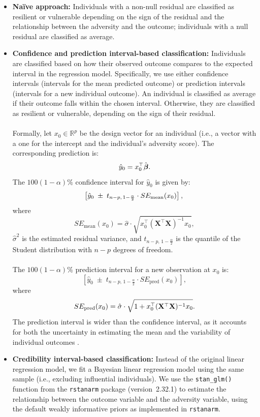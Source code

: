 \documentclass[12pt]{article}
\begin{document}
\begin{itemize}
\item \textbf{Naïve approach:} Individuals with a non-null residual are classified as resilient or vulnerable depending on the sign of the residual and the relationship between the adversity and the outcome; individuals with a null residual are classified as average.

\item \textbf{Confidence and prediction interval-based classification:}  
Individuals are classified based on how their observed outcome compares to the expected interval in the regression model. Specifically, we use either confidence intervals (intervals for the mean predicted outcome) or prediction intervals (intervals for a new individual outcome). An individual is classified as average if their outcome falls within the chosen interval. Otherwise, they are classified as resilient or vulnerable, depending on the sign of their residual.\\
\\
Formally, let \( x_0 \in \mathbb{R}^p \) be the design vector for an individual (i.e., a vector with a one for the intercept and the individual's adversity score). The corresponding prediction is:
\[
\hat y_0 = x_0^\top \hat{\boldsymbol{\beta}}.\\
\]
The \( 100(1 - \alpha)\% \) confidence interval for \(\hat y_0\) is given by:
\[
\left[ \hat y_0 \; \pm \; t_{n-p,\,1 - \frac{\alpha}{2}} \cdot SE_{\text{mean}}(x_0) \right],\\
\]
where
\[
SE_{\text{mean}}(x_0) = \hat{\sigma} \cdot \sqrt{x_0^\top (\mathbf{X}^\top \mathbf{X})^{-1} x_0},
\]
\( \hat{\sigma}^2 \) is the estimated residual variance, and \( t_{n-p,\,1 - \frac{\alpha}{2}} \) is the quantile of the Student distribution with \( n - p \) degrees of freedom.\\
\\
The \( 100(1 - \alpha)\% \) prediction interval for a new observation at \( x_0 \) is:
\[
\left[ \hat y_0 \; \pm \; t_{n-p,\,1 - \frac{\alpha}{2}} \cdot SE_{\text{pred}}(x_0) \right],
\]
where
\[
SE_{\text{pred}}(x_0) = \hat{\sigma} \cdot \sqrt{1 + x_0^\top (\mathbf{X}^\top \mathbf{X})^{-1} x_0}.\\
\]
The prediction interval is wider than the confidence interval, as it accounts for both the uncertainty in estimating the mean and the variability of individual outcomes \cite{confidence_and_prediction_intervals}.

\item \textbf{Credibility interval-based classification:}  
Instead of the original linear regression model, we fit a Bayesian linear regression model using the same sample (i.e., excluding influential individuals). We use the \texttt{stan\_glm()} function from the \texttt{rstanarm} package (version~2.32.1) to estimate the relationship between the outcome variable and the adversity variable, using the default weakly informative priors as implemented in \texttt{rstanarm}.


\end{itemize}
\end{document}

